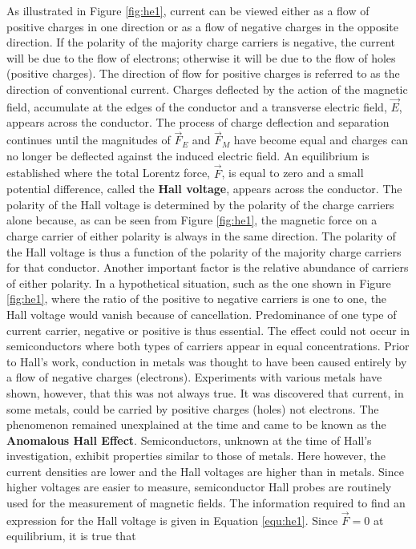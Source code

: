	As illustrated in Figure \ref{fig:he1}, current can be viewed either as a flow of positive charges in one direction or as a flow of negative charges in the opposite direction. If the polarity of the majority charge carriers is negative, the current will be due to the flow of electrons; otherwise it will be due to the flow of holes (positive charges). The direction of flow for positive charges is referred to as the direction of conventional current.
	Charges deflected by the action of the magnetic field, accumulate at the edges of the conductor and a transverse electric field, $\vec{E}$, appears across the conductor. The process of charge deflection and separation continues until the magnitudes of $\vec{F}_E$ and $\vec{F}_M$ have become equal and charges can no longer be deflected against the induced electric field. An equilibrium is established where the total Lorentz force, $\vec{F}$, is equal to zero and a small potential difference, called the {\bf Hall voltage}, appears across the conductor. The polarity of the Hall voltage is determined by the polarity of the charge carriers alone because, as can be seen from Figure \ref{fig:he1}, the magnetic force on a charge carrier of either polarity is always in the same direction. The polarity of the Hall voltage is thus a function of the polarity of the majority charge carriers for that conductor. 
	Another important factor is the relative abundance of carriers of either polarity. In a hypothetical situation, such as the one shown in Figure \ref{fig:he1}, where the ratio of the positive to negative carriers is one to one, the Hall voltage would vanish because of cancellation. Predominance of one type of current carrier, negative or positive is thus essential. The effect could not occur in semiconductors where both types of carriers appear in equal concentrations.
	Prior to Hall's work, conduction in metals was thought to have been caused entirely by a flow of negative charges (electrons). Experiments with various metals have shown, however, that this was not always true. It was discovered that current, in some metals, could be carried by positive charges (holes) not electrons. The phenomenon remained unexplained at the time and came to be known as the {\bf Anomalous Hall Effect}. 
	Semiconductors, unknown at the time of Hall's investigation, exhibit properties similar to those of metals. Here however, the current densities are lower and the Hall voltages are higher than in metals. Since higher voltages are easier to measure, semiconductor Hall probes are routinely used for the measurement of magnetic fields. 
	The information required to find an expression for the Hall voltage is given in Equation \ref{equ:he1}. Since $\vec{F}=0$ at equilibrium, it is true that

